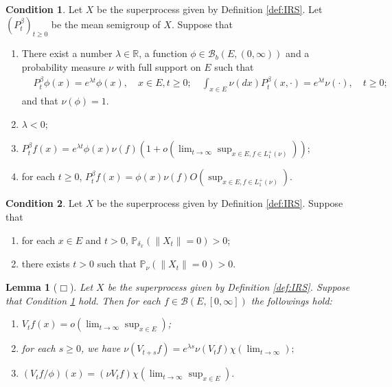 \documentclass[12pt,a4paper]{amsart}
\numberwithin{equation}{section}
\theoremstyle{plain}
\newtheorem{lem}[thm]{Lemma}
\theoremstyle{definition}
\newtheorem{cdt}{Condition}
\begin{document}
  \begin{cdt}
    \label{cdt:PSS}
    Let $X$ be the superprocess given by Definition \ref{def:IRS}. 
    Let $(P^\beta_t)_{t\geq 0}$ be the mean semigroup of $X$.
    Suppose that
\begin{enumerate}
\item
  \label{cdt:PSS1}
    There exist a number $\lambda \in \mathbb R$, a function $\phi \in \mathcal B_b(E, (0,\infty))$ and a probability measure $\nu$ with full support on $E$ such that
    \begin{align}
      & P_t^\beta \phi(x) 
        = e^{\lambda t} \phi(x),
        \quad x\in E, t\geq 0;
      \quad \int_{x\in E} \nu(dx) P_t^\beta(x,\cdot) 
           = e^{\lambda t} \nu(\cdot),
           \quad t\geq 0;
    \end{align}
    and that $\nu(\phi) = 1$.
  \item
    \label{cdt:PSS2}
    $\lambda < 0$;
  \item
    \label{cdt:PSS3}
    \(\displaystyle
    P_t^\beta f(x) 
    = e^{\lambda t} \phi(x) \nu(f) ( 1+ o(\lim_{t\to \infty} \sup_{x\in E, f\in L_1^+(\nu)}));
    \)
  \item
    \label{cdt:PSS4}
    for each $t\geq 0$, 
    \(\displaystyle
    P_t^\beta f(x) 
    = \phi(x) \nu(f) O(\sup_{x\in E, f\in L_1^+(\nu)}).
    \)
\end{enumerate}
  \end{cdt}
  \begin{cdt}
    \label{cdt:PSP}
    Let $X$ be the superprocess given by Definition \ref{def:IRS}. 
    Suppose that 
    \begin{enumerate}
    \item
      \label{cdt:PSP1}
      for each $x\in E$ and $t > 0$, $\mathbb P_{\delta_x}(\|X_t\| = 0)>0$;
     \item
       \label{cdt:PSP2}
       there exists $t> 0$ such that $\mathbb P_\nu (\|X_t\| = 0) > 0$.
    \end{enumerate}
  \end{cdt}
  \begin{lem}[$\Box$]
    \label{lem:PSK}
    Let $X$ be the superprocess given by Definition \ref{def:IRS}. 
    Suppose that Condition \ref{cdt:PSS} hold.
    Then for each $f\in \mathcal B(E, [0,\infty])$ the followings hold:
    \begin{enumerate}
    \item 
      \label{lem:PSK1} 
      $\displaystyle V_tf(x) = o(\lim_{t\to \infty} \sup_{x\in E})$;
    \item 
      \label{lem:PSK2}
      for each $s\geq 0$, we have 
      \(\displaystyle 
      \nu(V_{t+s}f) 
      = e^{\lambda s} \nu(V_tf) \chi(\lim_{t\to \infty});
      \)
    \item 
      \label{lem:PSK3}
      \( \displaystyle 
      (V_tf/\phi)(x) 
      = (\nu V_tf) \chi(\lim_{t\to \infty} \sup_{x\in E}).
      \)
    \end{enumerate}
  \end{lem}
\end{document}
